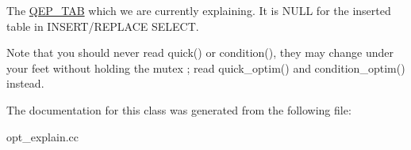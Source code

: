 The \mbox{\hyperlink{classQEP__TAB}{Q\+E\+P\+\_\+\+T\+AB}} which we are currently explaining. It is N\+U\+LL for the inserted table in I\+N\+S\+E\+R\+T/\+R\+E\+P\+L\+A\+CE S\+E\+L\+E\+CT. \begin{DoxyNote}{Note}
that you should never read quick() or condition(), they may change under your feet without holding the mutex ; read quick\+\_\+optim() and condition\+\_\+optim() instead. 
\end{DoxyNote}


The documentation for this class was generated from the following file\+:\begin{DoxyCompactItemize}
\item 
opt\+\_\+explain.\+cc\end{DoxyCompactItemize}
